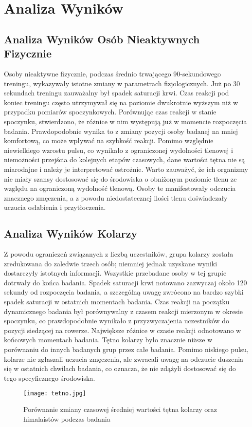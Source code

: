\chapter{Analiza Wyników}
\section{Analiza Wyników Osób Nieaktywnych Fizycznie}
Osoby nieaktywne fizycznie, podczas średnio trwającego 90-sekundowego treningu, wykazywały istotne zmiany w parametrach fizjologicznych. Już po 30 sekundach treningu zauważalny był spadek saturacji krwi. Czas reakcji pod koniec treningu często utrzymywał się na poziomie dwukrotnie wyższym niż w przypadku pomiarów spoczynkowych. Porównując czas reakcji w stanie spoczynku, stwierdzono, że różnice w nim występują już w momencie rozpoczęcia badania. Prawdopodobnie wynika to z zmiany pozycji osoby badanej na mniej komfortową, co może wpływać na szybkość reakcji. Pomimo względnie niewielkiego wzrostu pulsu, co wynikało z ograniczonej wydolności tlenowej i niemożności przejścia do kolejnych etapów czasowych,  dane wartości tętna nie są miarodajne i należy je interpretować ostrożnie. Warto zauważyć, że ich organizmy nie miały szansy dostosować się do środowiska o obniżonym poziomie tlenu ze względu na ograniczoną wydolność tlenową. Osoby te manifestowały odczucia znacznego zmęczenia, a z powodu niedostatecznej ilości tlenu doświadczały uczucia osłabienia i przytłoczenia.
\section{Analiza Wyników Kolarzy}
Z powodu ograniczeń związanych z liczbą uczestników, grupa kolarzy została zredukowana do zaledwie trzech osób; niemniej jednak uzyskane wyniki dostarczyły istotnych informacji. Wszystkie przebadane osoby w tej grupie dotrwały do końca badania. Spadek saturacji krwi notowano zazwyczaj około 120 sekundy od rozpoczęcia badania, a szczególną uwagę zwrócono na bardzo szybki spadek saturacji w ostatnich momentach badania. Czas reakcji na początku dynamicznego badania był porównywalny z czasem reakcji mierzonym w okresie spoczynku, co prawdopodobnie wynikało z przyzwyczajenia uczestników do pozycji siedzącej na rowerze. Największe różnice w czasie reakcji odnotowano w końcowych momentach badania. Tętno kolarzy było znacznie niższe w porównaniu do innych badanych grup przez całe badania. Pomimo niskiego pulsu, kolarze nie zgłaszali uczucia zmęczenia, ale zwracali uwagę na odczucie duszenia się w ostatnich chwilach badania, co oznacza, że nie zdążyli dostosować się do tego specyficznego środowiska.
\begin{figure}[!htb]
    \centering
    \texttt{[image: tetno.jpg]}
    \caption{Porównanie zmiany czasowej średniej wartości tętna kolarzy oraz himalaistów podczas badania}
\end{figure}
